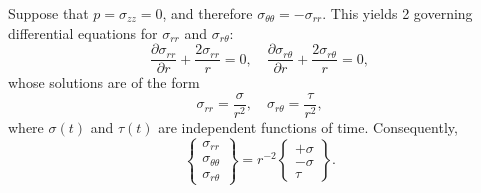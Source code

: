 Suppose that $p = \sigma_{zz} = 0$, and therefore $\sigma_{\theta \theta} = - \sigma_{rr}$. This yields 2 governing differential equations for $\sigma_{rr}$ and $\sigma_{r \theta}$:
\begin{equation}
  \frac{\partial \sigma_{rr}}{\partial r} + \frac{2 \sigma_{rr}}{r} = 0, \quad \frac{\partial \sigma_{r\theta}}{\partial r} + \frac{2 \sigma_{r\theta}}{r} = 0,
\end{equation}
whose solutions are of the form
\begin{equation}
  \sigma_{rr} = \frac{\sigma}{r^2}, \quad \sigma_{r\theta} = \frac{\tau}{r^2},
\end{equation}
where $\sigma(t)$ and $\tau(t)$ are independent functions of time. Consequently,
\begin{equation}
  \left\{ \begin{array}{c} \sigma_{rr} \\ \sigma_{\theta \theta} \\ \sigma_{r \theta} \end{array} \right\} = r^{-2} \left\{ \begin{array}{c} +\sigma \\ -\sigma \\ \tau \end{array} \right\}.
\end{equation}

